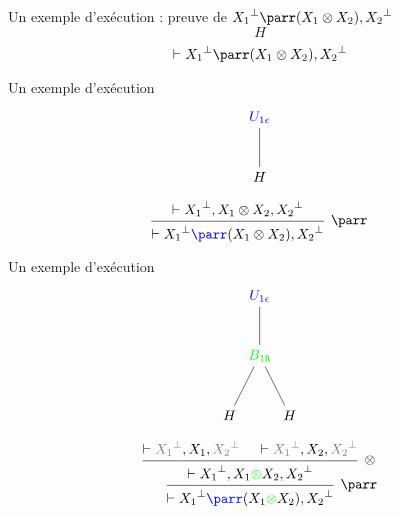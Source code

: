 \documentclass{beamer}
\newcommand*{\orth}{^\perp}
\newcommand*{\tensor}{\otimes}
\newcommand*{\hypv}[1]{\hypo{\vdash #1}}
\newcommand*{\tensorv}[1]{\infer{2}[\ensuremath{\tensor}]{\vdash #1}}
\newcommand*{\parrv}[1]{\infer{1}[\ensuremath{\parr}]{\vdash #1}}
\newcommand*{\Right}{\textnormal{\texttt{R}}}
\newcommand*{\unknown}{H}
\begin{document}
\begin{frame}{Un exemple d'exécution : preuve de ${X_1}\orth \parr (X_1 \tensor X_2), {X_2}\orth$}
    \begin{equation*}
    \unknown 
    \end{equation*}
    \begin{equation*}
        \begin{prooftree}
            \hypv{{X_1}\orth \parr (X_1 \tensor X_2), {X_2}\orth}
        \end{prooftree}
    \end{equation*}
\end{frame}

\begin{frame}{Un exemple d'exécution}
    \begin{equation*}
    \begin{tikzpicture}%
        [level 2/.style={sibling distance=3.5cm}]
        \node {$\textcolor{blue}{U_{1 \epsilon}}$}
        child {node {$\unknown$}
        };
    \end{tikzpicture}
    \end{equation*}
    \begin{equation*}
        \begin{prooftree}
               \hypv{{X_1}\orth, X_1 \tensor X_2, {X_2}\orth}
            \parrv{{X_1}\orth \textcolor{blue}{\parr} (X_1 \tensor X_2), {X_2}\orth}
        \end{prooftree}
    \end{equation*}
\end{frame}

\begin{frame}{Un exemple d'exécution}
    \begin{equation*}
    \begin{tikzpicture}%
        [level 2/.style={sibling distance=1.5cm}]
        \node {$\textcolor{blue}{U_{1 \epsilon}}$}
        child {node {$\textcolor{green}{B_{1 \Right}}$}
            child {node {$\unknown$}}
            child {node {$\unknown$}}
        };
    \end{tikzpicture}
    \end{equation*}
    \begin{equation*}
        \begin{prooftree}
                  \hypv{\textcolor{gray}{{X_1}\orth}, X_1, \textcolor{gray}{{X_2}\orth}}
                  
                  \hypv{\textcolor{gray}{{X_1}\orth}, X_2, \textcolor{gray}{{X_2}\orth}}
               \tensorv{{X_1}\orth, X_1 \textcolor{green}{\tensor} X_2, {X_2}\orth}
            \parrv{{X_1}\orth \textcolor{blue}{\parr} (X_1 \textcolor{green}{\tensor} X_2), {X_2}\orth}
        \end{prooftree}
    \end{equation*}
\end{frame}
\end{document}
